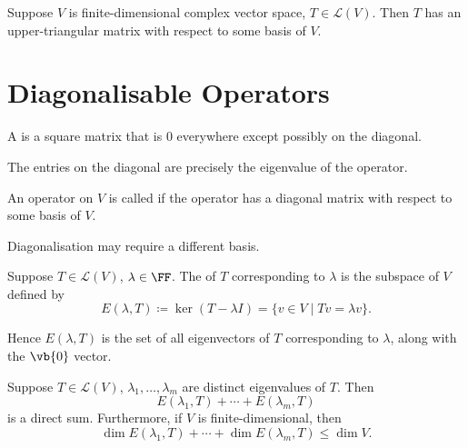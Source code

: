 \begin{theorem}
Suppose $V$ is finite-dimensional complex vector space, $T\in\mathcal{L}(V)$. Then $T$ has an upper-triangular matrix with respect to some basis of $V$.
\end{theorem}
\pagebreak

\section{Diagonalisable Operators}
\begin{definition}
A  is a square matrix that is $0$ everywhere except possibly on the diagonal.
\end{definition}

\begin{remark}
The entries on the diagonal are precisely the eigenvalue of the operator.
\end{remark}

\begin{definition}[Diagonalisable]
An operator on $V$ is called  if the operator has a diagonal matrix with respect to some basis of $V$.
\end{definition}

\begin{remark}
Diagonalisation may require a different basis.
\end{remark}

\begin{definition}[Eigenspace]
Suppose $T\in\mathcal{L}(V)$, $\lambda\in\FF$. The  of $T$ corresponding to $\lambda$ is the subspace of $V$ defined by
\[E(\lambda,T)\coloneqq\ker(T-\lambda I)=\{v\in V\mid Tv=\lambda v\}.\]
\end{definition}

\begin{remark}
Hence $E(\lambda,T)$ is the set of all eigenvectors of $T$ corresponding to $\lambda$, along with the $\vb{0}$ vector.
\end{remark}

\begin{proposition}
Suppose $T\in\mathcal{L}(V)$, $\lambda_1,\dots,\lambda_m$ are distinct eigenvalues of $T$. Then
\[E(\lambda_1,T)+\cdots+E(\lambda_m,T)\]
is a direct sum. Furthermore, if $V$ is finite-dimensional, then
\[\dim E(\lambda_1,T)+\cdots+\dim E(\lambda_m,T)\le\dim V.\]
\end{proposition}

